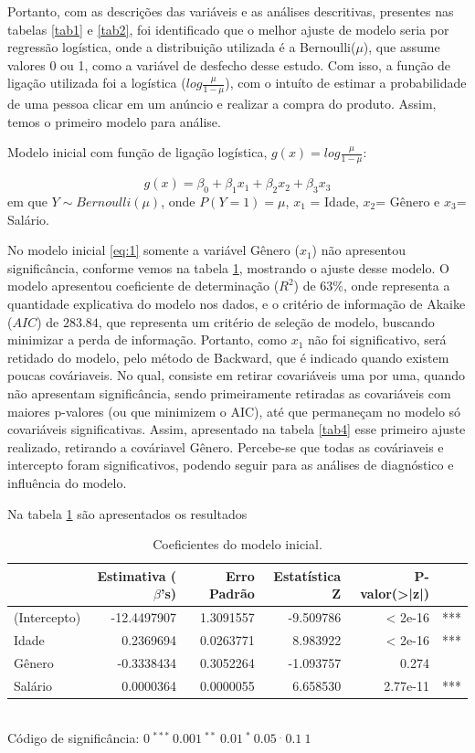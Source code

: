 \documentclass[a4paper]{article}
\begin{document}
Portanto, com as descrições das variáveis e as análises descritivas, presentes nas tabelas \ref{tab1} e \ref{tab2}, foi identificado que o melhor ajuste de modelo seria por regressão logística, onde a distribuição utilizada é a Bernoulli($\mu$), que assume valores 0 ou 1, como a variável de desfecho desse estudo. Com isso, a função de ligação utilizada foi a logística ($log\frac{\mu}{1-\mu}$), com o intuíto de estimar a probabilidade de uma pessoa clicar em um anúncio e realizar a compra do produto. Assim, temos o primeiro modelo para análise.

Modelo inicial com função de ligação logística, $g(x) = log\frac{\mu}{1-\mu}$: 

\begin{equation}\label{eq:1}
g(x)= \beta_0 + \beta_1 x_1  + \beta_2 x_2+ \beta_3 x_3
\end{equation}
em que $Y \sim Bernoulli(\mu)$, onde $ P(Y=1)=\mu$, $x_1$ = Idade, $x_2$= Gênero e $x_3$= Salário.

No modelo inicial \ref{eq:1} somente a variável Gênero ($x_1$) não apresentou significância, conforme vemos na tabela \ref{tab3}, mostrando o ajuste desse modelo. O modelo apresentou coeficiente de determinação ($R^2$) de $63\%$, onde representa a quantidade explicativa do modelo nos dados, e o critério de informação de Akaike ($AIC$) de $283.84$, que representa um critério de seleção de modelo, buscando minimizar a perda de informação. Portanto, como $x_1$ não foi significativo, será retidado do modelo, pelo método de Backward, que é indicado quando existem poucas cováriaveis. No qual, consiste em retirar covariáveis uma por uma, quando não apresentam significância, sendo primeiramente retiradas as covariáveis com maiores p-valores (ou que minimizem o AIC), até que permaneçam no modelo só covariáveis significativas. Assim, apresentado na tabela \ref{tab4} esse primeiro ajuste realizado, retirando
a cováriavel Gênero. Percebe-se que todas as cováriaveis e intercepto foram significativos, podendo seguir para as análises de diagnóstico e influência do modelo. 

Na tabela \ref{tab3} são apresentados os resultados 
\begin{table}[H] 
\caption{Coeficientes do modelo inicial.}
\begin{center}
\begin{tabular}{lrrrrl}
\hline
  & Estimativa ($\beta$'s) & Erro Padrão & Estatística Z & P-valor(>|z|)\\
\hline
(Intercepto) & -12.4497907 & 1.3091557 & -9.509786 & < 2e-16 & ***\\
Idade & 0.2369694 & 0.0263771 & 8.983922 & < 2e-16 & ***\\
Gênero & -0.3338434 & 0.3052264 & -1.093757 & 0.274 &\\
Salário & 0.0000364 & 0.0000055 & 6.658530 & 2.77e-11 & ***\\
\hline
\end{tabular}
\\\tiny{\hspace{-5cm} Código de significância: $0\ ^{***}\ 0.001\ ^{**}\ 0.01\ ^{*}\ 0.05\ ^{.}\ 0.1 \ 1$}
\label{tab3}
\end{center}
\end{table}
\end{document}
